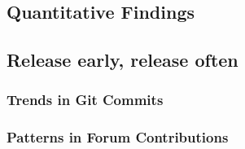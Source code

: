 
\subsection{Quantitative Findings}

\subsection{Release early, release often}


\subsubsection{Trends in Git Commits}







\subsubsection{Patterns in Forum Contributions}

